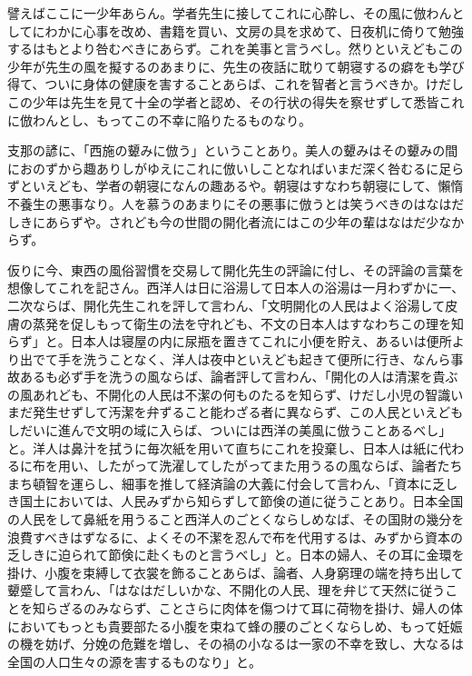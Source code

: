 \documentclass[a4paper, platex, dvipdfmx]{jsarticle}
\begin{document}
譬えばここに一少年あらん。学者先生に接してこれに心酔し、その風に倣わんとしてにわかに心事を改め、書籍を買い、文房の具を求めて、日夜机に倚りて勉強するはもとより咎むべきにあらず。これを美事と言うべし。然りといえどもこの少年が先生の風を擬するのあまりに、先生の夜話に耽りて朝寝するの癖をも学び得て、ついに身体の健康を害することあらば、これを智者と言うべきか。けだしこの少年は先生を見て十全の学者と認め、その行状の得失を察せずして悉皆これに倣わんとし、もってこの不幸に陥りたるものなり。

支那の諺に、「西施の顰みに倣う」ということあり。美人の顰みはその顰みの間におのずから趣ありしがゆえにこれに倣いしことなればいまだ深く咎むるに足らずといえども、学者の朝寝になんの趣あるや。朝寝はすなわち朝寝にして、懶惰不養生の悪事なり。人を慕うのあまりにその悪事に倣うとは笑うべきのはなはだしきにあらずや。されども今の世間の開化者流にはこの少年の輩はなはだ少なからず。

仮りに今、東西の風俗習慣を交易して開化先生の評論に付し、その評論の言葉を想像してこれを記さん。西洋人は日に浴湯して日本人の浴湯は一月わずかに一、二次ならば、開化先生これを評して言わん、「文明開化の人民はよく浴湯して皮膚の蒸発を促しもって衛生の法を守れども、不文の日本人はすなわちこの理を知らず」と。日本人は寝屋の内に尿瓶を置きてこれに小便を貯え、あるいは便所より出でて手を洗うことなく、洋人は夜中といえども起きて便所に行き、なんら事故あるも必ず手を洗うの風ならば、論者評して言わん、「開化の人は清潔を貴ぶの風あれども、不開化の人民は不潔の何ものたるを知らず、けだし小児の智識いまだ発生せずして汚潔を弁ずること能わざる者に異ならず、この人民といえどもしだいに進んで文明の域に入らば、ついには西洋の美風に倣うことあるべし」と。洋人は鼻汁を拭うに毎次紙を用いて直ちにこれを投棄し、日本人は紙に代わるに布を用い、したがって洗濯してしたがってまた用うるの風ならば、論者たちまち頓智を運らし、細事を推して経済論の大義に付会して言わん、「資本に乏しき国土においては、人民みずから知らずして節倹の道に従うことあり。日本全国の人民をして鼻紙を用うること西洋人のごとくならしめなば、その国財の幾分を浪費すべきはずなるに、よくその不潔を忍んで布を代用するは、みずから資本の乏しきに迫られて節倹に赴くものと言うべし」と。日本の婦人、その耳に金環を掛け、小腹を束縛して衣裳を飾ることあらば、論者、人身窮理の端を持ち出して顰蹙して言わん、「はなはだしいかな、不開化の人民、理を弁じて天然に従うことを知らざるのみならず、ことさらに肉体を傷つけて耳に荷物を掛け、婦人の体においてもっとも貴要部たる小腹を束ねて蜂の腰のごとくならしめ、もって妊娠の機を妨げ、分娩の危難を増し、その禍の小なるは一家の不幸を致し、大なるは全国の人口生々の源を害するものなり」と。
\end{document}
